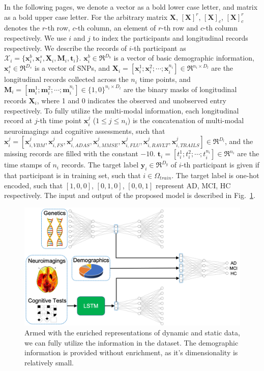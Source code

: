 In the following pages, we denote a vector as a bold lower case letter, and matrix as a bold upper case letter. For the arbitrary matrix $\mathbf{X}$, $[\mathbf{X}]^r$, $[\mathbf{X}]_c$, $[\mathbf{X}]^r_c$ denotes the $r$-th row, $c$-th column, an element of $r$-th row and $c$-th column respectively. We use $i$ and $j$ to index the participants and longitudinal records respectively. We describe the records of $i$-th participant as $\mathcal{X}_i = \{\mathbf{x}_i^b, \mathbf{x}_i^s, \mathbf{X}_i, \mathbf{M}_i, \mathbf{t}_i\}$. $\mathbf{x}_i^b \in \Re^{D_b}$ is a vector of basic demographic information, $\mathbf{x}_i^s \in \Re^{D_s}$ is a vector of SNPs, and $\mathbf{X}_i = [\mathbf{x}_i^1; \mathbf{x}_i^2; \cdots; \mathbf{x}_i^{n_i}] \in \Re^{n_i \times D_l}$ are the longitudinal records collected across the $n_i$ time points, and $\mathbf{M}_i = [\mathbf{m}_i^1; \mathbf{m}_i^2; \cdots; \mathbf{m}_i^{n_i}] \in \{1, 0\}^{n_i \times D_l}$ are the binary masks of longitudinal records $\mathbf{X}_i$, where 1 and 0 indicates the observed and unobserved entry respectively. To fully utilize the multi-modal information, each longitudinal record at $j$-th time point $\mathbf{x}_i^j$ ($1 \leq j \leq n_i$) is the concatenation of multi-modal neuroimagings and cognitive assessments, such that $\mathbf{x}_i^j = [\mathbf{x}_{i,VBM}^j,\mathbf{x}_{i,FS}^j,\mathbf{x}_{i,ADAS}^j,\mathbf{x}_{i,MMSE}^j,\mathbf{x}_{i,FLU}^j,\mathbf{x}_{i,RAVLT}^j,\mathbf{x}_{i,TRAILS}^j] \in \Re^{D_l}$, and the missing records are filled with the constant $-10$. $\mathbf{t}_i = [t_i^1; t_i^2; \cdots; t_i^{n_i}] \in \Re^{n_i}$ are the time stamps of $n_i$ records. The target label $\mathbf{y}_i \in \Re^{D_y}$ of $i$-th participant is given if that participant is in training set, such that $i \in \Omega_{train}$. The target label is one-hot encoded, such that $[1, 0, 0]$, $[0, 1, 0]$, $[0, 0, 1]$ represent AD, MCI, HC respectively. The input and output of the proposed model is described in Fig.~\ref{fig: final-inputs}.
\begin{figure}
    \includegraphics[width=\textwidth]{images/final-inputs.png}
    \caption{Armed with the enriched representations of dynamic and static data, we can fully utilize the information in the dataset. The demographic information is provided without enrichment, as it's dimensionality is relatively small.} \label{fig: final-inputs}
\end{figure}

